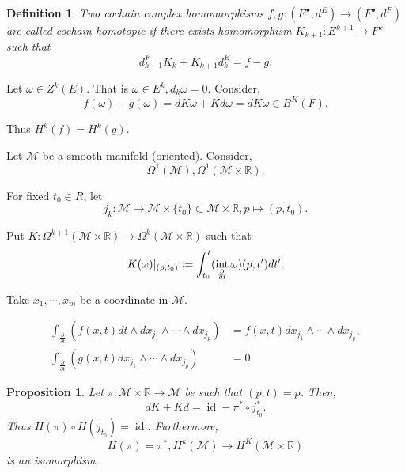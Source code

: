 \documentclass[10pt]{article}
\newtheorem{proposition}{Proposition}[section]
\newtheorem{definition}{Definition}[section]
\DeclareMathOperator{\interior}{int}
\DeclareMathOperator{\id}{id}
\newcommand{\defeq}{\vcentcolon=}
\newcommand{\R}[0]{\mathbb{R}}
\newcommand{\M}[0]{\mathcal{M}}
\newcommand{\pd}[2]{{\frac {\partial #1} {\partial #2}}}
\begin{document}
\begin{definition}
  Two cochain complex homomorphisms $f,g:(E^\bullet,d^E)\to(F^\bullet,d^F)$ are called cochain homotopic if there exists homomorphism $K_{k+1}:E^{k+1}\to F^k$ such that 
  \begin{equation*}
    d^F_{k-1}K_k+K_{k+1}d_k^E = f-g.
  \end{equation*}
\end{definition}

Let $\omega\in Z^k(E)$. That is $\omega\in E^k,d_k\omega = 0$. Consider,
\begin{equation*}
  f(\omega) - g(\omega) = dK\omega + Kd\omega = dK\omega\in B^K(F).
\end{equation*}

Thus $H^k(f)=H^k(g)$. 
\par Let $\M$ be a smooth manifold (oriented). Consider,
\begin{equation*}
  \Omega^1(\M),\Omega^1(\M\times \R). 
\end{equation*}

For fixed $t_0\in R$, let  
\begin{equation*}
  j_k:\M\to \M\times\{t_0\}\subset\M\times\R, p\mapsto (p,t_0).
\end{equation*}

Put $K:\Omega^{k+1}(\M\times\R) \to\Omega^k(\M\times\R)$ such that 
\begin{equation*}
  K(\omega)|_{(p,t_0)}\defeq\int_{t_0}^t (\interior_{\pd{}{t}}\omega)(p,t')dt'.
\end{equation*}

Take $x_1,\cdots,x_m$ be a coordinate in $\M$. 

\begin{align*}
  \int_{\pd{}{t}}(f(x,t)dt\wedge dx_{j_1}\wedge\cdots\wedge dx_{j_p}) & = f(x,t) dx_{j_1}\wedge\cdots\wedge dx_{j_p},\\
  \int_{\pd{}{t}}(g(x,t)dx_{j_1}\wedge\cdots\wedge dx_{j_p}) & = 0.
\end{align*}

\begin{proposition}
  Let $\pi:\M\times\R\to\M$ be such that $(p,t) = p$. Then,
  \begin{equation*}
    dK+Kd = \id-\pi^*\circ j_{t_0}^*.
  \end{equation*}
  Thus $H(\pi)\circ H(j_{t_0}) = \id$. Furthermore,
  \begin{equation*}
    H(\pi)=\pi^*,H^k(\M)\to H^K(\M\times\R)
  \end{equation*}
  is an isomorphism.
\end{proposition}
\end{document}
